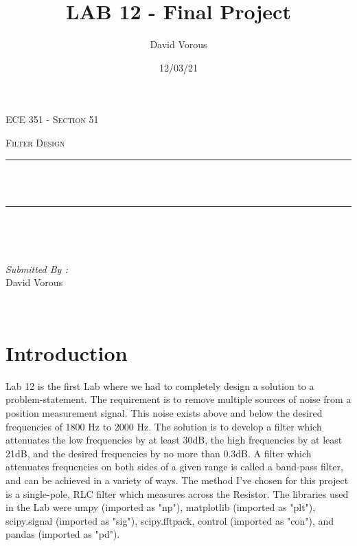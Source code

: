 \documentclass[12pt]{report}
\title{LAB 12 - Final Project}
\author{ David Vorous}
\date{12/03/21}
\makeatletter
\let\thetitle\@title
\makeatother
\begin{document}
\begin{titlepage}
	\centering
    \vspace*{0.5 cm}
\begin{center}    \textsc{\Large   ECE 351 - Section 51 }\\[2.0 cm]	\end{center}
	\textsc{\Large Filter Design }\\[0.5 cm]
	\rule{\linewidth}{0.2 mm} \\[0.4 cm]
	{ \huge \bfseries \thetitle}\\
	\rule{\linewidth}{0.2 mm} \\[1.5 cm]
	
	\begin{minipage}{0.4\textwidth}
		\begin{flushleft} \large
			\end{flushleft}
			\end{minipage}~
			\begin{minipage}{0.4\textwidth}
            
			\begin{flushright} \large
			\emph{Submitted By :} \\
			David Vorous  
		\end{flushright}
           
	\end{minipage}\\[2 cm]

\end{titlepage}


\tableofcontents

\pagebreak

\renewcommand{\thesection}{\arabic{section}}

\section{Introduction}
Lab 12 is the first Lab where we had to completely design a solution to a problem-statement. The requirement is to remove multiple sources of noise from a position measurement signal. This noise exists above and below the desired frequencies of 1800 Hz to 2000 Hz. The solution is to develop a filter which attenuates the low frequencies by at least 30dB, the high frequencies by at least 21dB, and the desired frequencies by no more than 0.3dB. A filter which attenuates frequencies on both sides of a given range is called a band-pass filter, and can be achieved in a variety of ways. The method I've chosen for this project is a single-pole, RLC filter which measures across the Resistor. The libraries used in the Lab were umpy (imported as "np"), matplotlib (imported as "plt"), scipy.signal (imported as "sig"), scipy.fftpack, control (imported as "con"), and pandas (imported as "pd").
\end{document}
